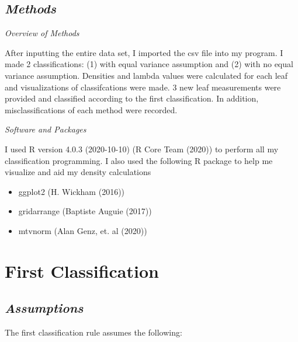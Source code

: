 \documentclass[]{article}
\providecommand{\tightlist}{%
  \setlength{\itemsep}{0pt}\setlength{\parskip}{0pt}}
\begin{document}
\subsection{\normalsize{\textit{Methods}}}

\textit{Overview of Methods}

After inputting the entire data set, I imported the csv file into my
program. I made 2 classifications: (1) with equal variance assumption
and (2) with no equal variance assumption. Densities and lambda values
were calculated for each leaf and visualizations of classifcations were
made. 3 new leaf measurements were provided and classified according to
the first classification. In addition, misclassifications of each method
were recorded.

\textit{Software and Packages}

I used R version 4.0.3 (2020-10-10) (R Core Team (2020)) to perform all
my classification programming. I also used the following R package to
help me visualize and aid my density calculations

\begin{itemize}
\tightlist
\item
  ggplot2 (H. Wickham (2016))
\item
  gridarrange (Baptiste Auguie (2017))
\item
  mtvnorm (Alan Genz, et. al (2020))
\end{itemize}

\newpage

\section{First Classification}

\subsection{\normalsize{\textit{Assumptions}}}

The first classification rule assumes the following:
\end{document}
